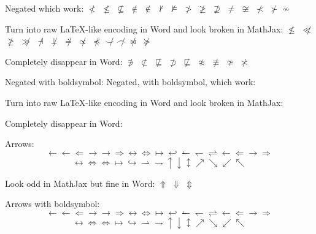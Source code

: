 \documentclass[12pt,a4paper]{article}
\theoremstyle{clearprint}
\begin{document}
\noindent 
Negated which work:
$\not<$ $\not\leq$ $\not\subseteq$  $\not\in$ $\notin$ $\not\vdash$ $\not\models$ $\not>$ $\not\geq$ $\not\supseteq$ $\not=$ $\not\cong$ $\not\prec$ $\not\succ$ $\not\sim$ 

Turn into raw LaTeX-like encoding in Word and look broken in MathJax:
$\not\le$ $\not\ll$ $\not\ge$ $\not\gg$ $\not\dashv$ $\not\perp$ $\not\doteq$ $\not\propto$ $\not\preceq$ 
$\not\smile$ $\not\frown$ $\not\bowtie$ $\not\succeq$

Completely disappear in Word:
$\not\ni$ $\not\subset$ $\not\sqsubseteq$ $\not\supset$ $\not\sqsubseteq$ $\not\approx$ $\not\equiv$ $\not\simeq$ $\not\asymp$ 


\noindent 
Negated with boldsymbol:
Negated, with boldsymbol, which work:
\boldsymbol{$\not<$ $\not\leq$ $\not\subseteq$  $\not\in$ $\notin$ $\not\vdash$ $\not\models$ $\not>$ $\not\geq$ $\not\supseteq$ $\not=$ $\not\cong$ $\not\prec$ $\not\succ$ $\not\sim$} 

Turn into raw LaTeX-like encoding in Word and look broken in MathJax:
\boldsymbol{$\not\le$ $\not\ll$ $\not\ge$ $\not\gg$ $\not\dashv$ $\not\perp$ $\not\doteq$ $\not\propto$ $\not\preceq$ $\not\smile$ $\not\frown$ $\not\bowtie$ $\not\succeq$}

Completely disappear in Word:
\boldsymbol{$\not\ni$ $\not\subset$ $\not\sqsubseteq$ $\not\supset$ $\not\sqsubseteq$ $\not\approx$ $\not\equiv$ $\not\simeq$ $\not\asymp$} 

\noindent
Arrows:
\begin{equation}
\leftarrow \gets \Leftarrow \rightarrow \to \Rightarrow \leftrightarrow \Leftrightarrow \mapsto \hookleftarrow \leftharpoonup \leftharpoondown \rightleftharpoons \longleftarrow \Longleftarrow \longrightarrow \Longrightarrow 
\end{equation}
\begin{equation}
\longleftrightarrow \Longleftrightarrow \iff \longmapsto \hookrightarrow \rightharpoonup \rightharpoondown \uparrow  \downarrow  \updownarrow  \nearrow \searrow \swarrow \nwarrow
\end{equation}

Look odd in MathJax but fine in Word: $\Uparrow$ $\Downarrow$ $\Updownarrow$

\noindent 
Arrows with boldsymbol:
\begin{equation}
\boldsymbol{\leftarrow \gets \Leftarrow \rightarrow \to \Rightarrow \leftrightarrow \Leftrightarrow \mapsto \hookleftarrow \leftharpoonup \leftharpoondown \rightleftharpoons \longleftarrow \Longleftarrow \longrightarrow \Longrightarrow} 
\end{equation}
\begin{equation}
\boldsymbol{\longleftrightarrow \Longleftrightarrow \iff \longmapsto \hookrightarrow \rightharpoonup \rightharpoondown \uparrow  \downarrow  \updownarrow  \nearrow \searrow \swarrow \nwarrow}
\end{equation}
\end{document}
